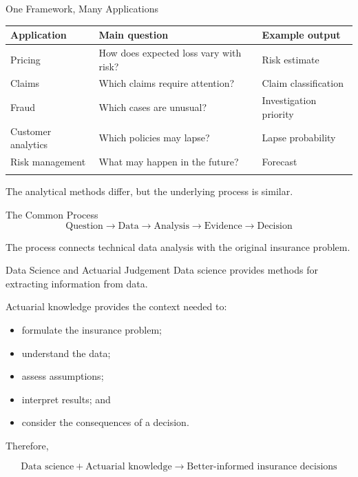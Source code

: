 \documentclass[
  ignorenonframetext,
  aspectratio=169,
]{beamer}
\newcounter{none} %
\providecommand{\tightlist}{%
  \setlength{\itemsep}{0pt}\setlength{\parskip}{0pt}}
\begin{document}
\begin{frame}{One Framework, Many Applications}
\protect{}\label{one-framework-many-applications}
{\def\LTcaptype{none} %
\begin{longtable}[]{@{}lll@{}}
\toprule\noalign{}
Application & Main question & Example output \\
\midrule\noalign{}
\endhead
Pricing & How does expected loss vary with risk? & Risk estimate \\
Claims & Which claims require attention? & Claim classification \\
Fraud & Which cases are unusual? & Investigation priority \\
Customer analytics & Which policies may lapse? & Lapse probability \\
Risk management & What may happen in the future? & Forecast \\
\bottomrule\noalign{}
\end{longtable}
}

The analytical methods differ, but the underlying process is similar.
\end{frame}

\begin{frame}{The Common Process}
\protect{}\label{the-common-process}
\[
\boxed{
\text{Question}
\rightarrow
\text{Data}
\rightarrow
\text{Analysis}
\rightarrow
\text{Evidence}
\rightarrow
\text{Decision}
}
\]

The process connects technical data analysis with the original insurance
problem.
\end{frame}

\begin{frame}{Data Science and Actuarial Judgement}
\protect{}\label{data-science-and-actuarial-judgement}
Data science provides methods for extracting information from data.

Actuarial knowledge provides the context needed to:

\begin{itemize}
\tightlist
\item
  formulate the insurance problem;
\item
  understand the data;
\item
  assess assumptions;
\item
  interpret results; and
\item
  consider the consequences of a decision.
\end{itemize}

Therefore,

\[
\boxed{
\text{Data science}
+
\text{Actuarial knowledge}
\rightarrow
\text{Better-informed insurance decisions}
}
\]
\end{frame}
\end{document}
